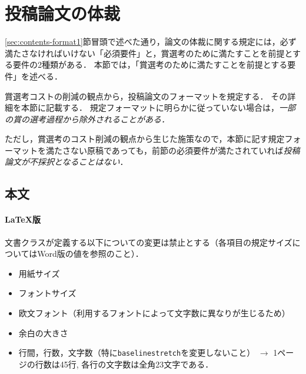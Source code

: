 \documentclass[
  platex, dvipdfmx,  %
]{nlp2024}
\newcommand{\code}[1]{\texttt{#1}}
\begin{document}
\section{投稿論文の体裁}
\label{sec:contents-format2}
\ref{sec:contents-format1}節冒頭で述べた通り，論文の体裁に関する規定には，必ず満たさなければいけない「必須要件」と，賞選考のために満たすことを前提とする要件の2種類がある．
本節では，「賞選考のために満たすことを前提とする要件」を述べる．

賞選考コストの削減の観点から，投稿論文のフォーマットを規定する．
その詳細を本節に記載する．
規定フォーマットに明らかに従っていない場合は，\emph{一部の賞の選考過程から除外されることがある．}

ただし，賞選考のコスト削減の観点から生じた施策なので，本節に記す規定フォーマットを満たさない原稿であっても，前節の必須要件が満たされていれば\emph{投稿論文が不採択となることはない}．



\subsection{本文}

\paragraph{LaTeX版}
文書クラスが定義する以下についての変更は禁止とする（各項目の規定サイズについてはWord版の値を参照のこと）．
\begin{itemize}
\item 用紙サイズ
\item フォントサイズ
\item 欧文フォント（利用するフォントによって文字数に異なりが生じるため）
\item 余白の大きさ
\item 行間，行数，文字数（特に\code{baselinestretch}を変更しないこと） $\rightarrow$ 1ページの行数は45行, 各行の文字数は全角23文字である．
\end{itemize}
\end{document}
